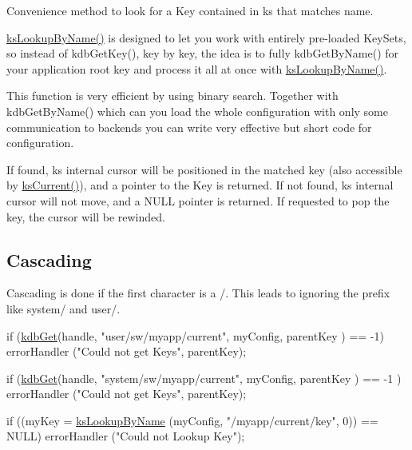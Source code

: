 Convenience method to look for a Key contained in {\ttfamily ks} that matches {\ttfamily name}. 

{\ttfamily \hyperlink{group__keyset_gad2e30fb6d4739d917c5abb2ac2f9c1a1}{ks\-Lookup\-By\-Name()}} is designed to let you work with entirely pre-\/loaded Key\-Sets, so instead of kdb\-Get\-Key(), key by key, the idea is to fully kdb\-Get\-By\-Name() for your application root key and process it all at once with {\ttfamily \hyperlink{group__keyset_gad2e30fb6d4739d917c5abb2ac2f9c1a1}{ks\-Lookup\-By\-Name()}}.

This function is very efficient by using binary search. Together with kdb\-Get\-By\-Name() which can you load the whole configuration with only some communication to backends you can write very effective but short code for configuration.

If found, {\ttfamily ks} internal cursor will be positioned in the matched key (also accessible by \hyperlink{group__keyset_ga4287b9416912c5f2ab9c195cb74fb094}{ks\-Current()}), and a pointer to the Key is returned. If not found, {\ttfamily ks} internal cursor will not move, and a N\-U\-L\-L pointer is returned. If requested to pop the key, the cursor will be rewinded.\hypertarget{group__keyset_cascading}{}\subsection{Cascading}\label{group__keyset_cascading}
Cascading is done if the first character is a /. This leads to ignoring the prefix like system/ and user/. 
\begin{DoxyCode}
\textcolor{keywordflow}{if} (\hyperlink{group__kdb_ga28e385fd9cb7ccfe0b2f1ed2f62453a1}{kdbGet}(handle, \textcolor{stringliteral}{"user/sw/myapp/current"}, myConfig, parentKey ) == -1)
        errorHandler (\textcolor{stringliteral}{"Could not get Keys"}, parentKey);

\textcolor{keywordflow}{if} (\hyperlink{group__kdb_ga28e385fd9cb7ccfe0b2f1ed2f62453a1}{kdbGet}(handle, \textcolor{stringliteral}{"system/sw/myapp/current"}, myConfig, parentKey ) == -1
      )
        errorHandler (\textcolor{stringliteral}{"Could not get Keys"}, parentKey);

\textcolor{keywordflow}{if} ((myKey = \hyperlink{group__keyset_gad2e30fb6d4739d917c5abb2ac2f9c1a1}{ksLookupByName} (myConfig, \textcolor{stringliteral}{"/myapp/current/key"}, 0)) 
      == NULL)
        errorHandler (\textcolor{stringliteral}{"Could not Lookup Key"});
\end{DoxyCode}


